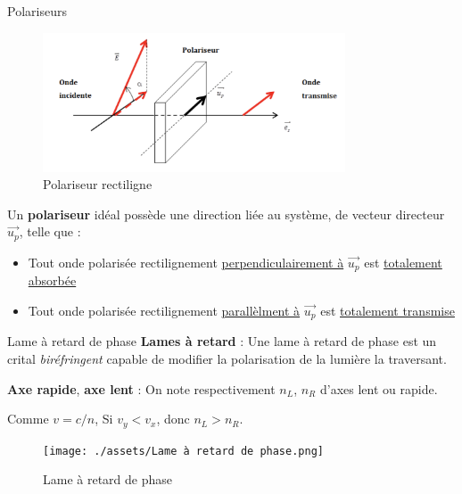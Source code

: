 \begin{Definition}[colbacktitle=red!75!black]{Polariseurs}{}
  \begin{figure}[H] %
    \centering
    \includegraphics[width=0.8\textwidth]{./assets/Polariseur rectiligne.png}
    \caption{Polariseur rectiligne}
  \end{figure}

  
Un \textbf{polariseur} idéal possède une direction liée au système, de vecteur directeur $\overrightarrow{u_p}$, telle que : 
\begin{itemize}

    \item Tout onde polarisée rectilignement \underline{perpendiculairement à} $\overrightarrow{u_p}$ est \underline{totalement absorbée}
    \item Tout onde polarisée rectilignement \underline{parallèlment à} $\overrightarrow{u_p}$ est \underline{totalement transmise}

\end{itemize}
\end{Definition}








\begin{Definition}[colbacktitle=red!75!black]{Lame à retard de phase}{}
\textbf{Lames à retard} : Une lame à retard de phase est un crital \textit{biréfringent} capable de modifier la polarisation de la lumière la traversant.

\textbf{Axe rapide}, \textbf{axe lent} : On note respectivement $n_L$, $n_R$ d'axes lent ou rapide. 

\center 
Comme $v = c / n$, Si $v_y< v_x$, donc $n_L > n_R$.

\begin{figure}[H] %
  \centering
  \texttt{[image: ./assets/Lame à retard de phase.png]}
  \caption{Lame à retard de phase}
  \label{fig:Lame à retard de phase}
\end{figure}


\end{Definition}



